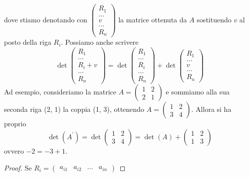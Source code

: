 \documentclass{book}
\begin{document}
\begin{enumerate}
  dove stiamo denotando con $\begin{pmatrix} R_1 \\ \dots \\ v\\ \dots \\ R_n \end{pmatrix}$ la matrice ottenuta da $A$ sostituendo $v$ al posto della riga $R_i$. Possiamo anche scrivere
  \begin{equation}
	\det\begin{pmatrix} R_1 \\ \dots \\ R_i+v\\ \dots \\ R_n \end{pmatrix}=\det\begin{pmatrix} R_1 \\ \dots \\ R_i\\ \dots \\ R_n \end{pmatrix}+\det \begin{pmatrix} R_1 \\ \dots \\ v\\ \dots \\ R_n \end{pmatrix}
  \end{equation}
  Ad esempio, consideriamo la matrice $A=\begin{pmatrix} 1 & 2 \\ 2 & 1 \end{pmatrix}$ e sommiamo
  alla sua seconda riga (2, 1) la coppia (1, 3), ottenendo  $A=\begin{pmatrix} 1 & 2 \\ 3 & 4 \end{pmatrix}$. Allora si ha proprio
  \begin{equation*}
	\det(A^\prime)=\det\begin{pmatrix} 1 & 2 \\ 3 & 4 \end{pmatrix}=\det(A)+\begin{pmatrix} 1 & 2 \\ 1 & 3 \end{pmatrix}
  \end{equation*}
  ovvero $-2=-3+1$.
		\begin{proof}
			Se $R_i=\begin{pmatrix}a_{i1} & a_{i2} & \dots & a_{in}\end{pmatrix}$

\end{proof}
\end{enumerate}
\end{document}
